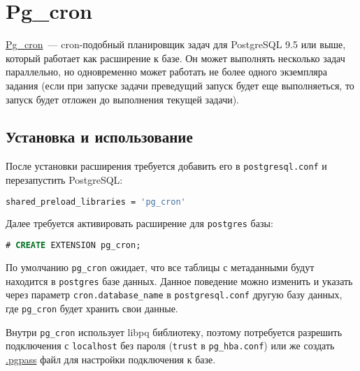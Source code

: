 \section{Pg\_cron}

\href{https://github.com/citusdata/pg\_cron}{Pg\_cron}~--- cron-подобный планировщик задач для PostgreSQL 9.5 или выше, который работает как расширение к базе. Он может выполнять несколько задач параллельно, но одновременно может работать не более одного экземпляра задания (если при запуске задачи преведущий запуск будет еще выполняеться, то запуск будет отложен до выполнения текущей задачи).

\subsection{Установка и использование}

После установки расширения требуется добавить его в \lstinline!postgresql.conf! и перезапустить PostgreSQL:

\begin{lstlisting}[language=Bash,label=lst:pgcron1,caption=pg\_cron]
shared_preload_libraries = 'pg_cron'
\end{lstlisting}

Далее требуется активировать расширение для \lstinline!postgres! базы:

\begin{lstlisting}[language=SQL,label=lst:pgcron2,caption=pg\_cron]
# CREATE EXTENSION pg_cron;
\end{lstlisting}

По умолчанию \lstinline!pg_cron! ожидает, что все таблицы с метаданными будут находится в \lstinline!postgres! базе данных. Данное поведение можно изменить и указать через параметр \lstinline!cron.database_name! в \lstinline!postgresql.conf! другую базу данных, где \lstinline!pg_cron! будет хранить свои данные.

Внутри \lstinline!pg_cron! использует libpq библиотеку, поэтому потребуется разрешить подключения с \lstinline!localhost! без пароля (\lstinline!trust! в \lstinline!pg_hba.conf!) или же создать \href{https://www.postgresql.org/docs/current/static/libpq-pgpass.html}{.pgpass} файл для настройки подключения к базе.
